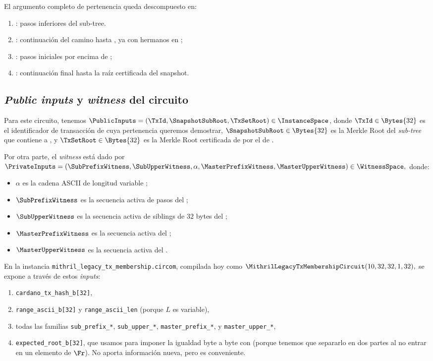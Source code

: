 El argumento completo de pertenencia queda descompuesto en:
\begin{enumerate}[noitemsep]
  \item \SubPrefix: pasos inferiores del sub-tree.
  \item \SubUpper: continuación del camino hasta \SnapshotSubRoot, ya con hermanos en ;
  \item \MasterPrefix: pasos iniciales por encima de \MasterLeaf;
  \item \MasterUpper: continuación final hasta la raíz certificada del snapshot.
\end{enumerate}

\subsection{\textit{Public inputs} y \textit{witness} del circuito}

Para este circuito, tenemos $\PublicInputs = (\TxId,\SnapshotSubRoot,\TxSetRoot) \in \InstanceSpace$, donde $\TxId \in \Bytes{32}$ es el identificador de transacción de \Cardano cuya pertenencia queremos demostrar, $\SnapshotSubRoot \in \Bytes{32}$ es la Merkle Root del \textit{sub-tree} que contiene a \TxId, y $\TxSetRoot \in \Bytes{32}$ es la Merkle Root certificada de por el \TransactionSnapshotCertificate de \Mithril.

Por otra parte, el \textit{witness} está dado por $\PrivateInputs = (\SubPrefixWitness, \SubUpperWitness, \alpha, \MasterPrefixWitness, \MasterUpperWitness) \in \WitnessSpace,$ donde:
\begin{itemize}[noitemsep]
  \item $\alpha$ es la cadena ASCII de longitud variable \RangeAscii;
  \item $\SubPrefixWitness$ es la secuencia activa de pasos del \SubPrefix;
  \item $\SubUpperWitness$ es la secuencia activa de siblings de $32$ bytes del \SubUpper;
  \item $\MasterPrefixWitness$ es la secuencia activa del \MasterPrefix;
  \item $\MasterUpperWitness$ es la secuencia activa del \MasterUpper.
\end{itemize}
En la instancia \texttt{mithril\_legacy\_tx\_membership\allowbreak.circom}, compilada hoy como
$\MithrilLegacyTxMembershipCircuit(10,32,32,1,32),$ se expone a través de estos \textit{inputs}:
\begin{enumerate}[noitemsep]
  \item \texttt{cardano\_tx\_hash\_b[32]},
  \item \texttt{range\_ascii\_b[32]} y \texttt{range\_ascii\_len} (porque $L$ es variable),
  \item todas las familias \texttt{sub\_prefix\_*}, \texttt{sub\_upper\_*}, \texttt{master\_prefix\_*}, y \texttt{master\_upper\_*},
  \item \texttt{expected\_root\_b[32]}, que usamos para imponer la igualdad byte a byte con \TxSetRoot (porque tenemos que separarlo en dos partes al no entrar en un elemento de $\Fr$). No aporta información nueva, pero es conveniente.
\end{enumerate}


